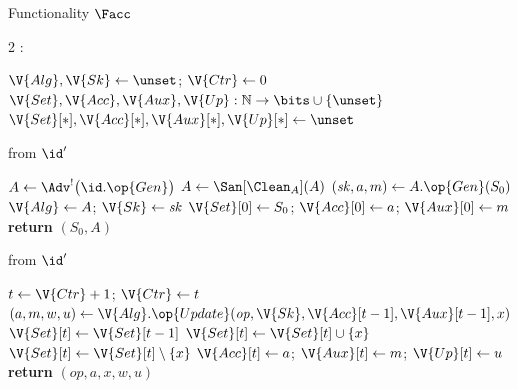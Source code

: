 \begin{interface}[nofloat]{Functionality $\Facc$ \\
}

{\scriptsize
\setlength{\columnsep}{1.4em}
\begin{multicols}{2}
:
\begin{algorithmic}[1]
\setcounter{contline}{0}\algcont
\State $\V{Alg}, \V{Sk} \gets \unset$; \quad $\V{Ctr} \gets 0$
\State $\V{Set}, \V{Acc}, \V{Aux}, \V{Up} : \mathbb{N} \to \bits \cup \{\unset\}$
\State $\V{Set}[*], \V{Acc}[*], \V{Aux}[*], \V{Up}[*] \gets \unset$
\algsave
\end{algorithmic}
\vspace{1.4ex}

 \quad from $\id'$
\begin{algorithmic}[1]
\algcont
{} \label{ln:acconce}
\State $A \gets \Adv^{!}\bigl(\id.\op{Gen}\bigr)$ \label{ln:accalg}
\State $A \gets \San[\Clean_{A}](A)$ \label{ln:accalgsan}
\State $(\mathit{sk}, a, m) \gets A.\op{Gen}(S_0)$
\State $\V{Alg} \gets A$; \quad $\V{Sk} \gets \mathit{sk}$
\State $\V{Set}[0] \gets S_0$; \quad $\V{Acc}[0] \gets a$; \quad $\V{Aux}[0] \gets m$
\State \textbf{return} $(S_0, A)$
\algsave
\end{algorithmic}
\vspace{1.4ex}

 \quad from $\id'$
\begin{algorithmic}[1]
\algcont
{}
 \label{ln:accdyn}
\State $t \gets \V{Ctr} + 1$; \quad $\V{Ctr} \gets t$
\State $(a, m, w, u) \gets \V{Alg}.\op{Update}(\mathit{op}, \V{Sk}, \V{Acc}[t-1], \V{Aux}[t-1], x)$
\State $\V{Set}[t] \gets \V{Set}[t-1]$
 \label{ln:acccorr}
\State $\V{Set}[t] \gets \V{Set}[t] \cup \{x\}$
\EndIf
{}
 \label{ln:accnegcorr}
\State $\V{Set}[t] \gets \V{Set}[t] \setminus \{x\}$
\EndIf
\State $\V{Acc}[t] \gets a$; \quad $\V{Aux}[t] \gets m$; \quad $\V{Up}[t] \gets u$
\State \textbf{return} $(\mathit{op}, a, x, w, u)$
\algsave
\end{algorithmic}
\vspace{1.4ex}


\end{multicols}}
\end{interface}
